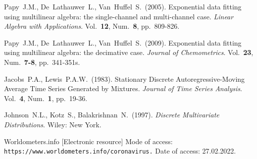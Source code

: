\documentclass[12pt]{article}
\theoremstyle{definition}
\theoremstyle{remark}
\begin{document}
\begin{thebibliography}{10}

  Papy~J.M., De~Lathauwer~L., Van~Huffel~S.~(2005).
  Exponential data fitting using multilinear algebra: the
  single-channel and multi-channel case.
  {\sl Linear Algebra with Applications}. Vol.~{\bf 12}, Num.~{\bf 8},
  pp.~809-826.

  Papy~J.M., De~Lathauwer~L., Van~Huffel~S.~(2009).
  Exponential data fitting using multilinear algebra: the decimative case.
  {\sl Journal of Chemometrics}. Vol.~{\bf 23}, Num.~{\bf 7-8},
  pp.~341-351s.

  Jacobs~P.A., Lewis~P.A.W.~(1983). Stationary Discrete
  Autoregressive-Moving Average
  Time Series Generated by Mixtures. {\sl Journal of Time Series
  Analysis}. Vol.~{\bf 4}, Num.~{\bf 1},
  pp.~19-36.

  Johnson~N.L., Kotz~S., Balakrishnan~N.~(1997). {\sl Discrete
  Multivariate Distributions}. Wiley: New York.

  Worldometers.info [Electronic resource] Mode of access:
  \texttt{https://www.worldometers.info/coronavirus.} Date of access:
  27.02.2022.

\end{thebibliography}
\end{document}
